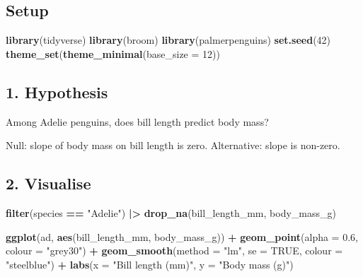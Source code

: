 \documentclass[
]{article}
\newenvironment{Shaded}{\begin{snugshade}}{\end{snugshade}}
\newcommand{\AttributeTok}[1]{\textcolor[rgb]{0.13,0.29,0.53}{#1}}
\newcommand{\ConstantTok}[1]{\textcolor[rgb]{0.56,0.35,0.01}{#1}}
\newcommand{\DecValTok}[1]{\textcolor[rgb]{0.00,0.00,0.81}{#1}}
\newcommand{\FloatTok}[1]{\textcolor[rgb]{0.00,0.00,0.81}{#1}}
\newcommand{\FunctionTok}[1]{\textcolor[rgb]{0.13,0.29,0.53}{\textbf{#1}}}
\newcommand{\NormalTok}[1]{#1}
\newcommand{\SpecialCharTok}[1]{\textcolor[rgb]{0.81,0.36,0.00}{\textbf{#1}}}
\newcommand{\StringTok}[1]{\textcolor[rgb]{0.31,0.60,0.02}{#1}}
\begin{document}
\subsection{Setup}\label{setup}

\begin{Shaded}
\begin{Highlighting}[]
\FunctionTok{library}\NormalTok{(tidyverse)}
\FunctionTok{library}\NormalTok{(broom)}
\FunctionTok{library}\NormalTok{(palmerpenguins)}
\FunctionTok{set.seed}\NormalTok{(}\DecValTok{42}\NormalTok{)}
\FunctionTok{theme\_set}\NormalTok{(}\FunctionTok{theme\_minimal}\NormalTok{(}\AttributeTok{base\_size =} \DecValTok{12}\NormalTok{))}
\end{Highlighting}
\end{Shaded}

\subsection{1. Hypothesis}\label{hypothesis}

Among Adelie penguins, does bill length predict body mass?

Null: slope of body mass on bill length is zero. Alternative: slope is
non-zero.

\subsection{2. Visualise}\label{visualise}

\begin{Shaded}
\begin{Highlighting}[]
  \FunctionTok{filter}\NormalTok{(species }\SpecialCharTok{==} \StringTok{"Adelie"}\NormalTok{) }\SpecialCharTok{|\textgreater{}}
  \FunctionTok{drop\_na}\NormalTok{(bill\_length\_mm, body\_mass\_g)}

\FunctionTok{ggplot}\NormalTok{(ad, }\FunctionTok{aes}\NormalTok{(bill\_length\_mm, body\_mass\_g)) }\SpecialCharTok{+}
  \FunctionTok{geom\_point}\NormalTok{(}\AttributeTok{alpha =} \FloatTok{0.6}\NormalTok{, }\AttributeTok{colour =} \StringTok{"grey30"}\NormalTok{) }\SpecialCharTok{+}
  \FunctionTok{geom\_smooth}\NormalTok{(}\AttributeTok{method =} \StringTok{"lm"}\NormalTok{, }\AttributeTok{se =} \ConstantTok{TRUE}\NormalTok{, }\AttributeTok{colour =} \StringTok{"steelblue"}\NormalTok{) }\SpecialCharTok{+}
  \FunctionTok{labs}\NormalTok{(}\AttributeTok{x =} \StringTok{"Bill length (mm)"}\NormalTok{, }\AttributeTok{y =} \StringTok{"Body mass (g)"}\NormalTok{)}
\end{Highlighting}
\end{Shaded}
\end{document}
